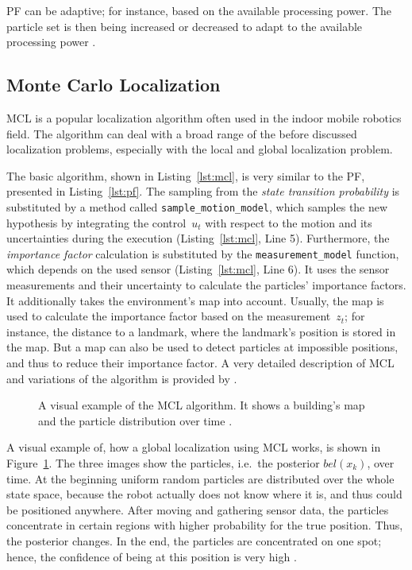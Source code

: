 \ac{PF} can be adaptive; for instance, based on the available processing power. The particle set is then being increased or decreased to adapt to the available processing power \citep{thrun:prob_robo}.


\subsection{Monte Carlo Localization}\label{sec:fund_mcl}
\ac{MCL} is a popular localization algorithm often used in the indoor mobile robotics field. The algorithm can deal with a broad range of the before discussed localization problems, especially with the local and global localization problem.



The basic algorithm, shown in Listing~\ref{lst:mcl}, is very similar to the \ac{PF}, presented in Listing~\ref{lst:pf}. The sampling from the \emph{state transition probability} is substituted by a method called \texttt{sample\_motion\_model}, which samples the new hypothesis by integrating the control~$u_t$ with respect to the motion and its uncertainties during the execution (Listing~\ref{lst:mcl}, Line 5). Furthermore, the \emph{importance factor} calculation is substituted by the \texttt{measurement\_model} function, which depends on the used sensor (Listing~\ref{lst:mcl}, Line 6). It uses the sensor measurements and their uncertainty to calculate the particles' importance factors. It additionally takes the environment's map into account. Usually, the map is used to calculate the importance factor based on the measurement~$z_t$; for instance, the distance to a landmark, where the landmark's position is stored in the map. But a map can also be used to detect particles at impossible positions, and thus to reduce their importance factor. A very detailed description of \ac{MCL} and variations of the algorithm is provided by \citet{thrun:prob_robo}.

\begin{figure}[width=0.9\textwidth, height=0.4\textheight]
	
	\caption{A visual example of the \acl{MCL} algorithm. It shows a building's map and the particle distribution over time \citep{thrun:prob_robo}.}
	\label{fig:mcl}
\end{figure}

A visual example of, how a global localization using \ac{MCL} works, is shown in Figure~\ref{fig:mcl}. The three images show the particles, i.e.\ the posterior $bel(x_k)$, over time. At the beginning uniform random particles are distributed over the whole state space, because the robot actually does not know where it is, and thus could be positioned anywhere. After moving and gathering sensor data, the particles concentrate in certain regions with higher probability for the true position. Thus, the posterior changes. In the end, the particles are concentrated on one spot; hence, the confidence of being at this position is very high \citep{thrun:prob_robo}.


